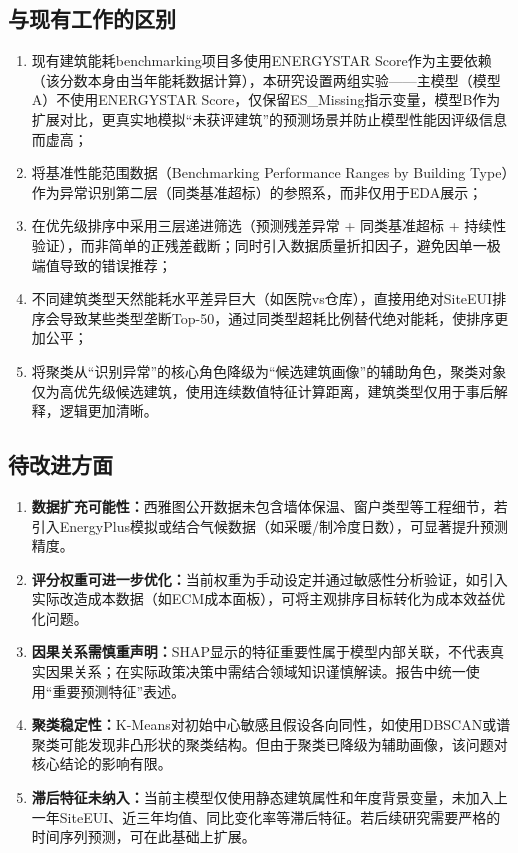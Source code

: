\subsection{与现有工作的区别}

\begin{enumerate}
    \item 现有建筑能耗benchmarking项目多使用ENERGYSTAR Score作为主要依赖（该分数本身由当年能耗数据计算），本研究设置两组实验——主模型（模型A）不使用ENERGYSTAR Score，仅保留ES\_Missing指示变量，模型B作为扩展对比，更真实地模拟``未获评建筑''的预测场景并防止模型性能因评级信息而虚高；

    \item 将基准性能范围数据（Benchmarking Performance Ranges by Building Type）作为异常识别第二层（同类基准超标）的参照系，而非仅用于EDA展示；

    \item 在优先级排序中采用三层递进筛选（预测残差异常 + 同类基准超标 + 持续性验证），而非简单的正残差截断；同时引入数据质量折扣因子，避免因单一极端值导致的错误推荐；

    \item 不同建筑类型天然能耗水平差异巨大（如医院vs仓库），直接用绝对SiteEUI排序会导致某些类型垄断Top-50，通过同类型超耗比例替代绝对能耗，使排序更加公平；

    \item 将聚类从``识别异常''的核心角色降级为``候选建筑画像''的辅助角色，聚类对象仅为高优先级候选建筑，使用连续数值特征计算距离，建筑类型仅用于事后解释，逻辑更加清晰。
\end{enumerate}

\subsection{待改进方面}

\begin{enumerate}
    \item \textbf{数据扩充可能性：}西雅图公开数据未包含墙体保温、窗户类型等工程细节，若引入EnergyPlus模拟或结合气候数据（如采暖/制冷度日数），可显著提升预测精度。

    \item \textbf{评分权重可进一步优化：}当前权重为手动设定并通过敏感性分析验证，如引入实际改造成本数据（如ECM成本面板），可将主观排序目标转化为成本效益优化问题。

    \item \textbf{因果关系需慎重声明：}SHAP显示的特征重要性属于模型内部关联，不代表真实因果关系；在实际政策决策中需结合领域知识谨慎解读。报告中统一使用``重要预测特征''表述。

    \item \textbf{聚类稳定性：}K-Means对初始中心敏感且假设各向同性，如使用DBSCAN或谱聚类可能发现非凸形状的聚类结构。但由于聚类已降级为辅助画像，该问题对核心结论的影响有限。

    \item \textbf{滞后特征未纳入：}当前主模型仅使用静态建筑属性和年度背景变量，未加入上一年SiteEUI、近三年均值、同比变化率等滞后特征。若后续研究需要严格的时间序列预测，可在此基础上扩展。
\end{enumerate}
